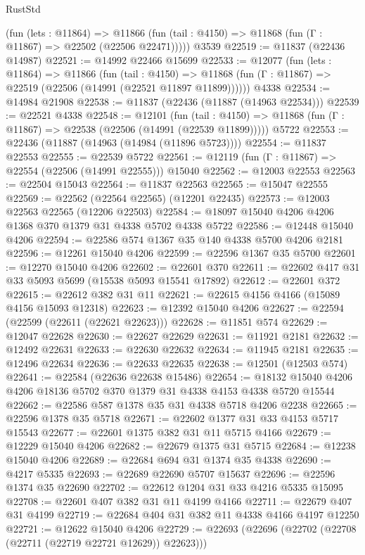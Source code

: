 \begin{lexlean}{RustStd}
\begin{coremodule}
{\begin{coremodule}
{{{{{{{{{{{{{{{{{{{{{{{{{{{{{{{{{{{{{{{{{{{{{{{{{{      (fun (lets : @11864) =>
      @11866 (fun (tail : @4150) => @11868 (fun (Γ : @11867) => @22502 (@22506 @22471)))))
    @3539
@22519 := @11837 (@22436 @14987)
@22521 := @14992 @22466 @15699
@22533 := @12077
    (fun (lets : @11864) =>
    @11866
      (fun (tail : @4150) =>
      @11868 (fun (Γ : @11867) => @22519 (@22506 (@14991 (@22521 @11897 @11899))))))
    @4338
@22534 := @14984 @21908
@22538 := @11837 (@22436 (@11887 (@14963 @22534)))
@22539 := @22521 @4338
@22548 := @12101
    (fun (tail : @4150) => @11868 (fun (Γ : @11867) => @22538 (@22506 (@14991 (@22539 @11899)))))
    @5722
@22553 := @22436 (@11887 (@14963 (@14984 (@11896 @5723))))
@22554 := @11837 @22553
@22555 := @22539 @5722
@22561 := @12119 (fun (Γ : @11867) => @22554 (@22506 (@14991 @22555))) @15040
@22562 := @12003 @22553
@22563 := @22504 @15043
@22564 := @11837 @22563
@22565 := @15047 @22555
@22569 := @22562 (@22564 @22565) (@12201 @22435)
@22573 := @12003 @22563 @22565 (@12206 @22503)
@22584 := @18097 @15040 @4206 @4206 @1368 @370 @1379 @31 @4338 @5702 @4338 @5722
@22586 := @12448 @15040 @4206
@22594 := @22586 @574 @1367 @35 @140 @4338 @5700 @4206 @2181
@22596 := @12261 @15040 @4206
@22599 := @22596 @1367 @35 @5700
@22601 := @12270 @15040 @4206
@22602 := @22601 @370
@22611 := @22602 @417 @31 @33 @5093 @5699 (@15538 @5093 @15541 @17892)
@22612 := @22601 @372
@22615 := @22612 @382 @31 @11
@22621 := @22615 @4156 @4166 (@15089 @4156 @15093 @12318)
@22623 := @12392 @15040 @4206
@22627 := @22594 (@22599 (@22611 (@22621 @22623)))
@22628 := @11851 @574
@22629 := @12047 @22628
@22630 := @22627 @22629
@22631 := @11921 @2181
@22632 := @12492 @22631
@22633 := @22630 @22632
@22634 := @11945 @2181
@22635 := @12496 @22634
@22636 := @22633 @22635
@22638 := @12501 (@12503 @574)
@22641 := @22584 (@22636 @22638 @15486)
@22654 := @18132 @15040 @4206 @4206 @18136 @5702 @370 @1379 @31 @4338 @4153 @4338 @5720 @15544
@22662 := @22586 @587 @1378 @35 @31 @4338 @5718 @4206 @2238
@22665 := @22596 @1378 @35 @5718
@22671 := @22602 @1377 @31 @33 @4153 @5717 @15543
@22677 := @22601 @1375 @382 @31 @11 @5715 @4166
@22679 := @12229 @15040 @4206
@22682 := @22679 @1375 @31 @5715
@22684 := @12238 @15040 @4206
@22689 := @22684 @694 @31 @1374 @35 @4338
@22690 := @4217 @5335
@22693 := @22689 @22690 @5707 @15637
@22696 := @22596 @1374 @35 @22690
@22702 := @22612 @1204 @31 @33 @4216 @5335 @15095
@22708 := @22601 @407 @382 @31 @11 @4199 @4166
@22711 := @22679 @407 @31 @4199
@22719 := @22684 @404 @31 @382 @11 @4338 @4166 @4197 @12250
@22721 := @12622 @15040 @4206
@22729 := @22693 (@22696 (@22702 (@22708 (@22711 (@22719 @22721 @12629)) @22623)))
}}}}}}}}}}}}}}}}}}}}}}}}}}}}}}}}}}}}}}}}}}}}}}}}}}
\end{coremodule}}
\end{coremodule}
\end{lexlean}
